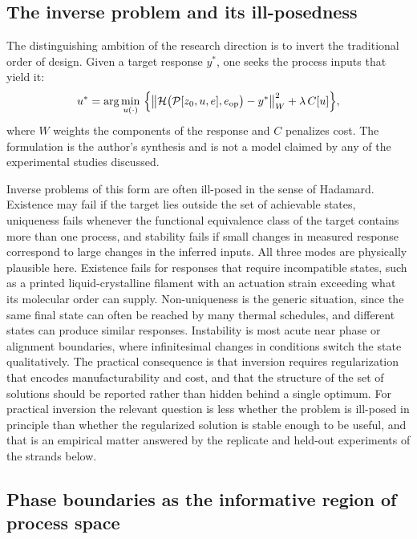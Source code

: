 \documentclass[11pt]{article}
\theoremstyle{definition}
\newcommand{\Hmap}{\mathcal{H}}
\newcommand{\Pmap}{\mathcal{P}}
\begin{document}
\subsection{The inverse problem and its ill-posedness}

The distinguishing ambition of the research direction is to invert the traditional order of design. Given a target response $y^\ast$, one seeks the process inputs that yield it:
\begin{equation}
u^\ast=\arg\min_{u(\cdot)}\ \Bigl\{\bigl\|\Hmap\bigl(\Pmap[z_0,u,e],e_{\mathrm{op}}\bigr)-y^\ast\bigr\|_W^2+\lambda\,C[u]\Bigr\},
\label{eq:inverse}
\end{equation}
where $W$ weights the components of the response and $C$ penalizes cost. The formulation is the author's synthesis and is not a model claimed by any of the experimental studies discussed.

Inverse problems of this form are often ill-posed in the sense of Hadamard. Existence may fail if the target lies outside the set of achievable states, uniqueness fails whenever the functional equivalence class of the target contains more than one process, and stability fails if small changes in measured response correspond to large changes in the inferred inputs. All three modes are physically plausible here. Existence fails for responses that require incompatible states, such as a printed liquid-crystalline filament with an actuation strain exceeding what its molecular order can supply. Non-uniqueness is the generic situation, since the same final state can often be reached by many thermal schedules, and different states can produce similar responses. Instability is most acute near phase or alignment boundaries, where infinitesimal changes in conditions switch the state qualitatively. The practical consequence is that inversion requires regularization that encodes manufacturability and cost, and that the structure of the set of solutions should be reported rather than hidden behind a single optimum. For practical inversion the relevant question is less whether the problem is ill-posed in principle than whether the regularized solution is stable enough to be useful, and that is an empirical matter answered by the replicate and held-out experiments of the strands below.

\subsection{Phase boundaries as the informative region of process space}
\end{document}
